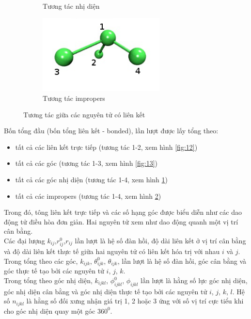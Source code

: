 \documentclass[12pt,a4paper,reqno, oneside]{book}
\begin{document}
\begin{figure}
\begin{subfigure}{0.5\textwidth}
		\caption{Tương tác nhị diện}
		\label{fig:14}
		\end{subfigure}
		\begin{subfigure}{0.5\textwidth}
		\includegraphics[width=0.7\textwidth,natwidth=610,natheight=642]{ff/impropers}
		\caption{Tương tác impropers}
		\label{fig:impropers}
		\end{subfigure}
		\caption{
		\label{fig:bond}%
		Tương tác giữa các nguyên tử có liên kết}
		\end{figure}
		Bốn tổng đầu (bốn tổng liên kết - bonded), lần lượt được lấy tổng theo:
		\begin{itemize}
		\item tất cả các liên kết trực tiếp (tương tác 1-2, xem hình \ref{fig:12})
		\item tất cả các góc (tương tác 1-3, xem hình \ref{fig:13})
		\item tất cả các góc nhị diện (tương tác 1-4, xem hình \ref{fig:14})
		\item tất cả các impropers (tương tác 1-4, xem hình \ref{fig:impropers})
		\end{itemize}
		Trong đó, tông liên kết trực tiếp và các số hạng góc được biểu diễn như các dao động tử điều hòa đơn giản. Hai nguyên tử xem như dao động quanh một vị trí cân bằng.\\
		Các đại lượng $k_{ij}$,$r^{0}_{ij}$,$r_{ij}$ lần lượt là hệ số đàn hồi, độ dài liên kết ở vị trí cân bằng và độ dài liên kết thực tế giữa hai nguyên tử có liên kết hóa trị với nhau $i$ và $j$.
		Trong tổng theo các góc, $k_{ijk}$, $\theta^{0}_{ijk}$, $\theta_{ijk}$, lần lượt là hệ số đàn hồi, góc cân bằng và góc thực tế tạo bởi các nguyên tử $i $, $j $, $k $.\\
		Trong tổng theo góc nhị diện, $k_{ijkl}$, $\phi^{0}_{ijkl}$, $\phi_{ijkl}$ lần lượt là hằng số lực góc nhị diện, góc nhị diện cân bằng và góc nhị diện thực tế tạo bởi các nguyên tử $i$, $j$, $k$, $l$. Hệ số $n_{ijkl}$ là hằng số đối xưng nhận giá trị 1, 2 hoặc 3 ứng với số vị trí cực tiểu khi cho góc nhị diện quay một góc $360^{0}$.\\			
\end{document}
